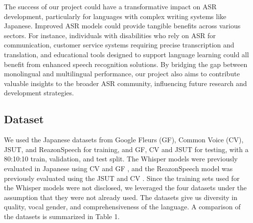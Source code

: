 \documentclass[10pt,twocolumn,letterpaper]{article}
\begin{document}
The success of our project could have a transformative impact on ASR development, particularly for languages with complex writing systems like Japanese. Improved ASR models could provide tangible benefits across various sectors. For instance, individuals with disabilities who rely on ASR for communication, customer service systems requiring precise transcription and translation, and educational tools designed to support language learning could all benefit from enhanced speech recognition solutions. By bridging the gap between monolingual and multilingual performance, our project also aims to contribute valuable insights to the broader ASR community, influencing future research and development strategies.

\subsection{Dataset}
We used the Japanese datasets from Google Fleurs (GF)\cite{conneauFLEURSFewshotLearning2022}, Common Voice (CV)\cite{ardilaCommonVoiceMassivelyMultilingual2020}, JSUT\cite{sonobeJSUTCorpusFree2017}, and ReazonSpeech \cite{yinReazonSpeechFreeMassive} for training, and GF, CV and JSUT for testing, with a 80:10:10 train, validation, and test split. The Whisper models were previously evaluated in Japanese using CV and GF \cite{radfordRobustSpeechRecognition}, and the ReazonSpeech model was previously evaluated using the JSUT and CV \cite{holdingsReazonSpeechV21Setting2024}. Since the training sets used for the Whisper models were not disclosed, we leveraged the four datasets under the assumption that they were not already used. The datasets give us diversity in quality, vocal gender, and comprehensiveness of the language. A comparison of the datasets is summarized in Table 1.
\begin{table}[ht]
\centering
{}
\caption{Comparison of Datasets}
\end{table}
\end{document}
